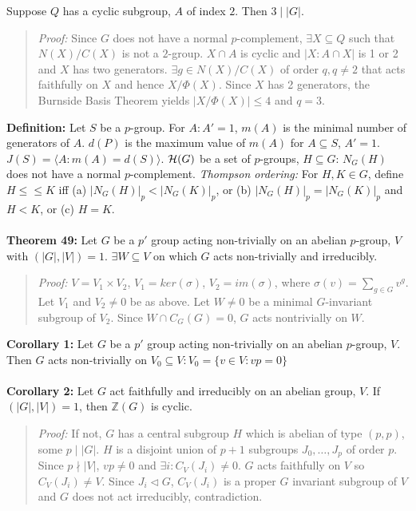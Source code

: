 Suppose $Q$ has a cyclic subgroup,
$A$ of index $2$.  Then $ 3 \mid |G|$.
\begin{quote}
\emph{Proof:}
Since $G$ does not have a normal $p$-complement, $\exists X \subseteq Q$ such that $N(X)/C(X)$ is not a
$2$-group. $X \cap A$ is cyclic and $|X: A \cap X|$ is 1 or 2 and $X$ has two generators.
$\exists g \in N(X)/C(X)$ of order
$q, q \neq 2$ that acts faithfully on $X$ and hence $X/\Phi(X)$.  Since $X$ has 2 generators, the Burnside
Basis Theorem yields $|X/\Phi(X)| \leq 4$ and $q = 3$.
\end{quote}
{\bf Definition:} Let $S$ be a  $p$-group.  For $A: A' = 1$, $m(A)$ is the minimal number of generators of $A$.
$d(P)$ is the maximum value of $m(A)$ for $A \subseteq S$, $A' = 1$. $J(S) = \langle A: m(A) = d(S) \rangle$.
${\cal H}(G)$ be a set of $p$-groups, $H \subseteq G$: $N_G(H)$ does not have a normal $p$-complement.
\emph{Thompson ordering:} For $H, K \in G$, define $H \leq \leq K$ iff (a) $|N_G(H)|_p < |N_G(K)|_p$, or
(b) $|N_G(H)|_p = |N_G(K)|_p$ and $H < K$, or
(c) $H = K$.
\\
\\
{\bf Theorem 49:}   Let $G$ be a $p'$ group acting non-trivially on an abelian $p$-group, $V$ with
$(|G|, |V|) =1$.  $\exists W \subseteq V$ on which $G$ acts non-trivially and irreducibly.
\begin{quote}
\emph{Proof:}
$V = V_1 \times V_2$, $V_1 = ker(\sigma)$, $V_2 = im(\sigma)$, where
$\sigma(v)= \sum_{g \in G} v^g$.
Let $V_1$ and $V_2 \neq 0$ be as above.  Let $W \neq 0$ be a minimal $G$-invariant
subgroup of $V_2$.  Since $W \cap C_G(G) = 0$, $G$ acts nontrivially on $W$.
\end{quote}
{\bf Corollary 1:}   Let $G$ be a $p'$ group acting non-trivially on an abelian $p$-group, $V$.
Then $G$ acts non-trivially on $V_0 \subseteq V: V_0 = \{ v \in V: vp = 0 \}$
\\
\\
{\bf Corollary 2:}   Let $G$ act faithfully and irreducibly on an abelian group, $V$.
If $(|G|, |V|) =1$, then ${\mathbb Z}(G)$ is cyclic.
\begin{quote}
\emph{Proof:}
If not, $G$  has a central subgroup $H$ which is abelian of type $(p, p)$, some $p \mid |G|$.
$H$ is a disjoint union of $p+1$ subgroups $J_0, \ldots, J_p$ of order $p$. Since $p \nmid |V|$,
$vp \neq 0$ and $\exists i: C_V(J_i) \neq 0$.  $G$ acts faithfully on $V$ so $C_V(J_i) \neq V$.
Since $J_i \lhd G$, $C_V(J_i)$ is a proper $G$ invariant subgroup of $V$ and $G$ does not act irreducibly,
contradiction.
\end{quote}
